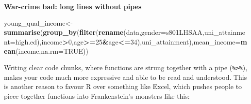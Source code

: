 \documentclass[]{book}
\newenvironment{Shaded}{\begin{snugshade}}{\end{snugshade}}
\newcommand{\DataTypeTok}[1]{\textcolor[rgb]{0.13,0.29,0.53}{#1}}
\newcommand{\DecValTok}[1]{\textcolor[rgb]{0.00,0.00,0.81}{#1}}
\newcommand{\ErrorTok}[1]{\textcolor[rgb]{0.64,0.00,0.00}{\textbf{#1}}}
\newcommand{\KeywordTok}[1]{\textcolor[rgb]{0.13,0.29,0.53}{\textbf{#1}}}
\newcommand{\NormalTok}[1]{#1}
\newcommand{\OperatorTok}[1]{\textcolor[rgb]{0.81,0.36,0.00}{\textbf{#1}}}
\newcommand{\OtherTok}[1]{\textcolor[rgb]{0.56,0.35,0.01}{#1}}
\newcommand{\StringTok}[1]{\textcolor[rgb]{0.31,0.60,0.02}{#1}}
\begin{document}
\textbf{War-crime bad: long lines without pipes}

\begin{Shaded}
\begin{Highlighting}[]
\NormalTok{young_qual_income<-}\KeywordTok{summarise}\NormalTok{(}\KeywordTok{group_by}\NormalTok{(}\KeywordTok{filter}\NormalTok{(}\KeywordTok{rename}\NormalTok{(data,}\DataTypeTok{gender=}\NormalTok{s801LHSAA,}\DataTypeTok{uni_attainment=}\NormalTok{high.ed),income}\OperatorTok{>}\DecValTok{0}\NormalTok{,age}\OperatorTok{>=}\DecValTok{25}\OperatorTok{&}\NormalTok{age}\OperatorTok{<=}\DecValTok{34}\NormalTok{),uni_attainment),}\DataTypeTok{mean_income=}\KeywordTok{mean}\NormalTok{(income,}\DataTypeTok{na.rm=}\OtherTok{TRUE}\NormalTok{))}
\end{Highlighting}
\end{Shaded}

Writing clear code chunks, where functions are strung together with a pipe (\texttt{\%\textgreater{}\%}), makes your code much more expressive and able to be read and understood. This is another reason to favour R over something like Excel, which pushes people to piece together functions into Frankenstein's monsters like this:

\begin{Shaded}
\end{Shaded}
\end{document}
